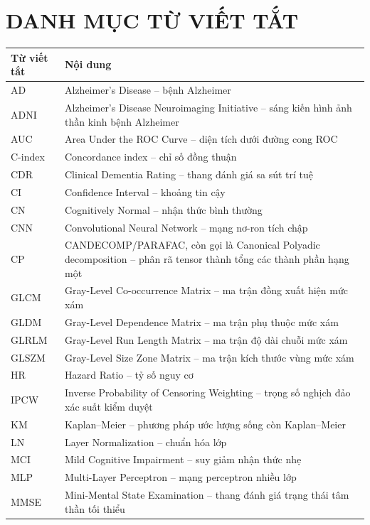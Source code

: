 \chapter*{DANH MỤC TỪ VIẾT TẮT}

{\renewcommand{\baselinestretch}{1.10}\small
\renewcommand{\arraystretch}{1.0}
\begin{longtable}{@{}L{2.5cm}L{12.7cm}@{}}
\toprule
Từ viết tắt & Nội dung \\
\midrule
\endhead
AD & Alzheimer's Disease -- bệnh Alzheimer \\
ADNI & Alzheimer's Disease Neuroimaging Initiative -- sáng kiến hình ảnh thần kinh bệnh Alzheimer \\
AUC & Area Under the ROC Curve -- diện tích dưới đường cong ROC \\
C-index & Concordance index -- chỉ số đồng thuận \\
CDR & Clinical Dementia Rating -- thang đánh giá sa sút trí tuệ \\
CI & Confidence Interval -- khoảng tin cậy \\
CN & Cognitively Normal -- nhận thức bình thường \\
CNN & Convolutional Neural Network -- mạng nơ-ron tích chập \\
CP & CANDECOMP/PARAFAC, còn gọi là Canonical Polyadic decomposition -- phân rã tensor thành tổng các thành phần hạng một \\
GLCM & Gray-Level Co-occurrence Matrix -- ma trận đồng xuất hiện mức xám \\
GLDM & Gray-Level Dependence Matrix -- ma trận phụ thuộc mức xám \\
GLRLM & Gray-Level Run Length Matrix -- ma trận độ dài chuỗi mức xám \\
GLSZM & Gray-Level Size Zone Matrix -- ma trận kích thước vùng mức xám \\
HR & Hazard Ratio -- tỷ số nguy cơ \\
IPCW & Inverse Probability of Censoring Weighting -- trọng số nghịch đảo xác suất kiểm duyệt \\
KM & Kaplan--Meier -- phương pháp ước lượng sống còn Kaplan--Meier \\
LN & Layer Normalization -- chuẩn hóa lớp \\
MCI & Mild Cognitive Impairment -- suy giảm nhận thức nhẹ \\
MLP & Multi-Layer Perceptron -- mạng perceptron nhiều lớp \\
MMSE & Mini-Mental State Examination -- thang đánh giá trạng thái tâm thần tối thiểu \\

\end{longtable}}
